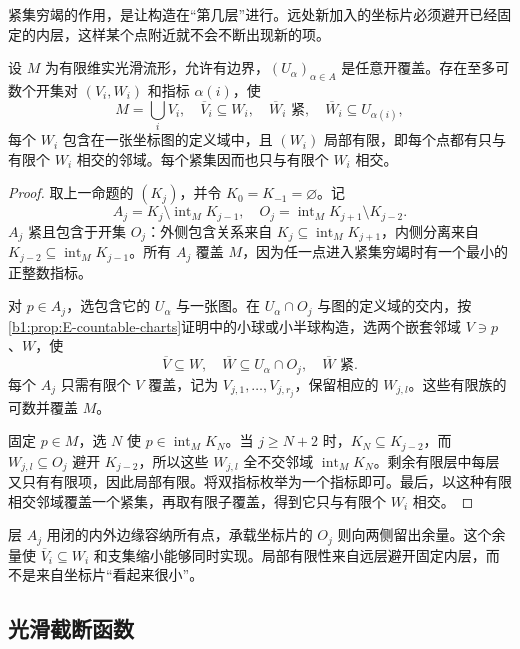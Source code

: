 紧集穷竭的作用，是让构造在“第几层”进行。远处新加入的坐标片必须避开已经固定的内层，这样某个点附近就不会不断出现新的项。

\begin{lemma}[局部有限的坐标细化]\label{b1:lem:E-locally-finite-refinement}
设 \(M\) 为有限维实光滑流形，允许有边界，\((U_\alpha)_{\alpha\in A}\) 是任意开覆盖。存在至多可数个开集对 \((V_i,W_i)\) 和指标 \(\alpha(i)\)，使
\[
 M=\bigcup_iV_i,\quad
 \overline V_i\subseteq W_i,\quad
 \overline W_i\text{ 紧},\quad
 \overline W_i\subseteq U_{\alpha(i)},
\]
每个 \(W_i\) 包含在一张坐标图的定义域中，且 \((W_i)\) 局部有限，即每个点都有只与有限个 \(W_i\) 相交的邻域。每个紧集因而也只与有限个 \(W_i\) 相交。
\end{lemma}
\begin{proof}
取上一命题的 \((K_j)\)，并令 \(K_0=K_{-1}=\varnothing\)。记
\[
 A_j=K_j\setminus\operatorname{int}_M K_{j-1},
 \quad O_j=\operatorname{int}_M K_{j+1}\setminus K_{j-2}.
\]
\(A_j\) 紧且包含于开集 \(O_j\)：外侧包含关系来自 \(K_j\subseteq\operatorname{int}_M K_{j+1}\)，内侧分离来自 \(K_{j-2}\subseteq\operatorname{int}_M K_{j-1}\)。所有 \(A_j\) 覆盖 \(M\)，因为任一点进入紧集穷竭时有一个最小的正整数指标。

对 \(p\in A_j\)，选包含它的 \(U_\alpha\) 与一张图。在 \(U_\alpha\cap O_j\) 与图的定义域的交内，按\cref{b1:prop:E-countable-charts}证明中的小球或小半球构造，选两个嵌套邻域 \(V\ni p\)、\(W\)，使
\[
 \overline V\subseteq W,\quad
 \overline W\subseteq U_\alpha\cap O_j,
 \quad\overline W\text{ 紧}.
\]
每个 \(A_j\) 只需有限个 \(V\) 覆盖，记为 \(V_{j,1},\ldots,V_{j,r_j}\)，保留相应的 \(W_{j,l}\)。这些有限族的可数并覆盖 \(M\)。

固定 \(p\in M\)，选 \(N\) 使 \(p\in\operatorname{int}_M K_N\)。当 \(j\geq N+2\) 时，\(K_N\subseteq K_{j-2}\)，而 \(W_{j,l}\subseteq O_j\) 避开 \(K_{j-2}\)，所以这些 \(W_{j,l}\) 全不交邻域 \(\operatorname{int}_M K_N\)。剩余有限层中每层又只有有限项，因此局部有限。将双指标枚举为一个指标即可。最后，以这种有限相交邻域覆盖一个紧集，再取有限子覆盖，得到它只与有限个 \(W_i\) 相交。
\end{proof}

层 \(A_j\) 用闭的内外边缘容纳所有点，承载坐标片的 \(O_j\) 则向两侧留出余量。这个余量使 \(\overline V_i\subseteq W_i\) 和支集缩小能够同时实现。局部有限性来自远层避开固定内层，而不是来自坐标片“看起来很小”。

\subsection{光滑截断函数}
\label{b1:subsec:E10202}


